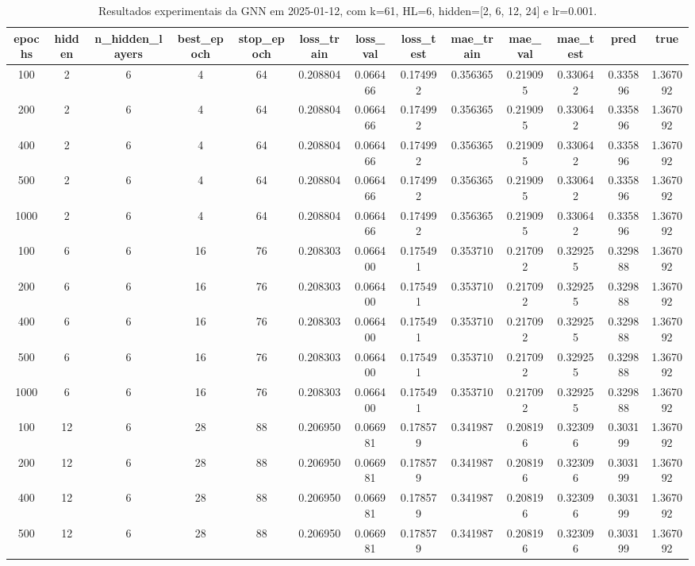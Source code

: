 \begin{table}[h]
\centering
\caption{Resultados experimentais da GNN em 2025-01-12, com k=61, HL=6, hidden=[2, 6, 12, 24] e lr=0.001.}
\label{tab:gnn_results_k61_hl6_d20250112}
\begin{tabular}{ccccccccccccc}
\toprule
epochs & hidden & n\_hidden\_layers & best\_epoch & stop\_epoch & loss\_train & loss\_val & loss\_test & mae\_train & mae\_val & mae\_test & pred & true \\
\midrule
100 & 2 & 6 & 4 & 64 & 0.208804 & 0.066466 & 0.174992 & 0.356365 & 0.219095 & 0.330642 & 0.335896 & 1.367092 \\
200 & 2 & 6 & 4 & 64 & 0.208804 & 0.066466 & 0.174992 & 0.356365 & 0.219095 & 0.330642 & 0.335896 & 1.367092 \\
400 & 2 & 6 & 4 & 64 & 0.208804 & 0.066466 & 0.174992 & 0.356365 & 0.219095 & 0.330642 & 0.335896 & 1.367092 \\
500 & 2 & 6 & 4 & 64 & 0.208804 & 0.066466 & 0.174992 & 0.356365 & 0.219095 & 0.330642 & 0.335896 & 1.367092 \\
1000 & 2 & 6 & 4 & 64 & 0.208804 & 0.066466 & 0.174992 & 0.356365 & 0.219095 & 0.330642 & 0.335896 & 1.367092 \\
100 & 6 & 6 & 16 & 76 & 0.208303 & 0.066400 & 0.175491 & 0.353710 & 0.217092 & 0.329255 & 0.329888 & 1.367092 \\
200 & 6 & 6 & 16 & 76 & 0.208303 & 0.066400 & 0.175491 & 0.353710 & 0.217092 & 0.329255 & 0.329888 & 1.367092 \\
400 & 6 & 6 & 16 & 76 & 0.208303 & 0.066400 & 0.175491 & 0.353710 & 0.217092 & 0.329255 & 0.329888 & 1.367092 \\
500 & 6 & 6 & 16 & 76 & 0.208303 & 0.066400 & 0.175491 & 0.353710 & 0.217092 & 0.329255 & 0.329888 & 1.367092 \\
1000 & 6 & 6 & 16 & 76 & 0.208303 & 0.066400 & 0.175491 & 0.353710 & 0.217092 & 0.329255 & 0.329888 & 1.367092 \\
100 & 12 & 6 & 28 & 88 & 0.206950 & 0.066981 & 0.178579 & 0.341987 & 0.208196 & 0.323096 & 0.303199 & 1.367092 \\
200 & 12 & 6 & 28 & 88 & 0.206950 & 0.066981 & 0.178579 & 0.341987 & 0.208196 & 0.323096 & 0.303199 & 1.367092 \\
400 & 12 & 6 & 28 & 88 & 0.206950 & 0.066981 & 0.178579 & 0.341987 & 0.208196 & 0.323096 & 0.303199 & 1.367092 \\
500 & 12 & 6 & 28 & 88 & 0.206950 & 0.066981 & 0.178579 & 0.341987 & 0.208196 & 0.323096 & 0.303199 & 1.367092 \\

\end{tabular}
\end{table}
